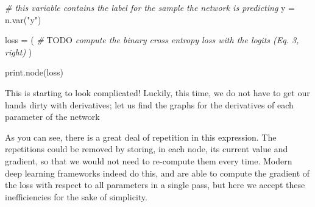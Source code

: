 \documentclass[
  a4paper,
]{article}
\newenvironment{Shaded}{\begin{snugshade}}{\end{snugshade}}
\newcommand{\AlertTok}[1]{\textcolor[rgb]{0.94,0.16,0.16}{#1}}
\newcommand{\CommentTok}[1]{\textcolor[rgb]{0.56,0.35,0.01}{\textit{#1}}}
\newcommand{\ControlFlowTok}[1]{\textcolor[rgb]{0.13,0.29,0.53}{\textbf{#1}}}
\newcommand{\FunctionTok}[1]{\textcolor[rgb]{0.00,0.00,0.00}{#1}}
\newcommand{\NormalTok}[1]{#1}
\newcommand{\OtherTok}[1]{\textcolor[rgb]{0.56,0.35,0.01}{#1}}
\newcommand{\SpecialCharTok}[1]{\textcolor[rgb]{0.00,0.00,0.00}{#1}}
\newcommand{\StringTok}[1]{\textcolor[rgb]{0.31,0.60,0.02}{#1}}
\begin{document}
\begin{Shaded}
\begin{Highlighting}[]
\CommentTok{\# this variable contains the label for the sample the network is predicting}
\NormalTok{y }\OtherTok{=} \FunctionTok{n.var}\NormalTok{(}\StringTok{"y"}\NormalTok{)}

\NormalTok{loss }\OtherTok{=}\NormalTok{ (}
  \CommentTok{\# }\AlertTok{TODO}\CommentTok{ compute the binary cross entropy loss with the logits (Eq. 3, right)}
\NormalTok{)}

\FunctionTok{print.node}\NormalTok{(loss)}
\end{Highlighting}
\end{Shaded}

This is starting to look complicated! Luckily, this time, we do not have
to get our hands dirty with derivatives; let us find the graphs for the
derivatives of each parameter of the network

\begin{Shaded}
\end{Shaded}

As you can see, there is a great deal of repetition in this expression.
The repetitions could be removed by storing, in each node, its current
value and gradient, so that we would not need to re-compute them every
time. Modern deep learning frameworks indeed do this, and are able to
compute the gradient of the loss with respect to all parameters in a
single pass, but here we accept these inefficiencies for the sake of
simplicity.
\end{document}
